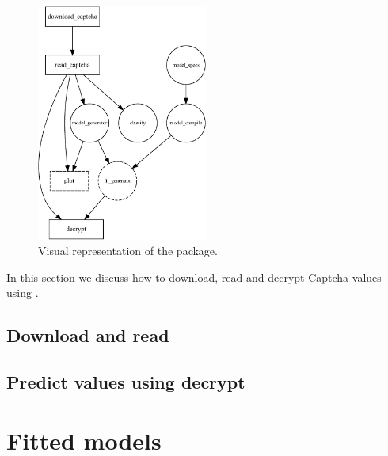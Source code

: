 \documentclass[article,nojss]{jss}
\begin{document}
\begin{CodeChunk}
\begin{figure}

{\centering \includegraphics[width=0.5\textwidth]{decryptr_jss_files/figure-latex/diagram-1} 

}

\caption[Visual representation of the package]{Visual representation of the package.}\label{fig:diagram}
\end{figure}
\end{CodeChunk}

In this section we discuss how to download, read and decrypt Captcha
values using .

\hypertarget{download-and-read}{%
\subsection{Download and read}\label{download-and-read}}

\lipsum[2]

\hypertarget{predict-values-using-decrypt}{%
\subsection{Predict values using
decrypt}\label{predict-values-using-decrypt}}

\lipsum[2]

\hypertarget{fitted-models}{%
\section{Fitted models}\label{fitted-models}}

\lipsum[2]
\end{document}
